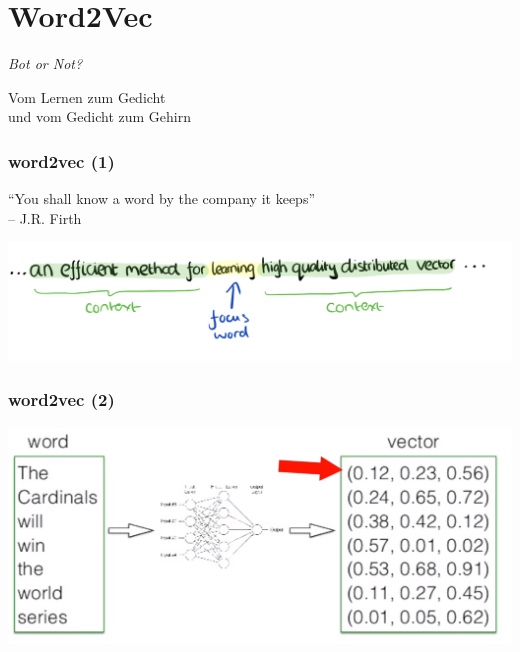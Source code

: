 \documentclass[aspectratio=43,x11names]{beamer}
\begin{document}

\section{Word2Vec}

\begin{frame}
\begin{center}
\huge
\emph{Bot or Not?}
\bigskip

\Large
Vom Lernen zum Gedicht\\
und vom Gedicht zum Gehirn
\end{center}
\end{frame}

\begin{frame}
\frametitle{word2vec (1)}
\begin{center}
``You shall know a word by the company it keeps''\\
\qquad\qquad\qquad\qquad -- J.R. Firth
\bigskip\bigskip\bigskip\bigskip

\includegraphics[width=\textwidth]{images/word2vec-context} 
\end{center}
\end{frame}

\begin{frame}
\frametitle{word2vec (2)}
\begin{center}
\includegraphics[width=\textwidth]{images/word2vec-diagram} 
\end{center}
\end{frame}
\end{document}
